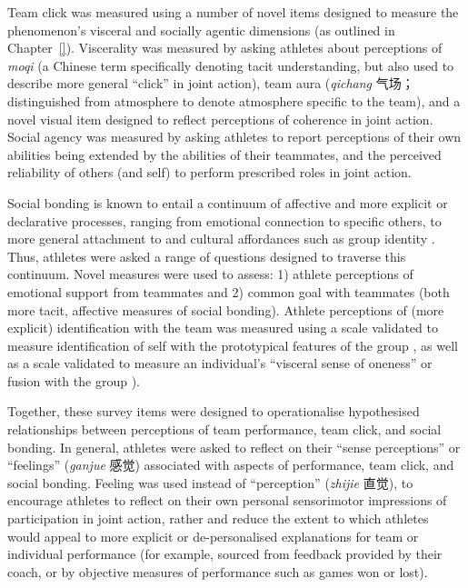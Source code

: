 \begin{CJK}{UTF8}{gbsn}
Team click was measured using a number of novel items designed to measure the phenomenon's visceral and socially agentic dimensions (as outlined in Chapter~\ref{}).  Viscerality was measured by asking athletes about perceptions of \textit{moqi} (a Chinese term specifically denoting tacit understanding, but also used to describe more general ``click'' in joint action), team aura (\textit{qichang} 气场；distinguished from atmosphere to denote atmosphere specific to the team), and a novel visual item designed to reflect perceptions of coherence in joint action.  Social agency was measured by asking athletes to report perceptions of their own abilities being extended by the abilities of their teammates, and the perceived reliability of others (and self) to perform prescribed roles in joint action.

Social bonding is known to entail a continuum of affective and more explicit or declarative processes, ranging from emotional connection to specific others, to more general attachment to and cultural affordances such as group identity \citep{Dunbar2010,Whitehouse2014}.  Thus, athletes were asked a range of questions designed to traverse this continuum. Novel measures were used to assess: 1) athlete perceptions of emotional support from teammates and 2) common goal with teammates (both more tacit, affective measures of social bonding).  Athlete perceptions of (more explicit) identification with the team was measured using a scale validated to measure identification of self with the prototypical features of the group \citep[Group Identification, see][]{Turner1987}, as well as a scale validated to measure an individual's ``visceral sense of oneness'' or fusion with the group \citep[Identity Fusion; see][]{Swann2009}).

Together, these survey items were designed to operationalise hypothesised relationships between perceptions of team performance, team click, and social bonding.  In general, athletes were asked to reflect on their ``sense perceptions'' or ``feelings'' (\textit{ganjue} 感觉) associated with aspects of performance, team click, and social bonding.  Feeling was used instead of ``perception'' (\textit{zhijie} 直觉), to encourage athletes to reflect on their own personal sensorimotor impressions of participation in joint action, rather and reduce the extent to which athletes would appeal to more explicit or de-personalised explanations for team or individual performance (for example, sourced from feedback provided by their coach, or by objective measures of performance such as games won or lost).


\end{CJK}
